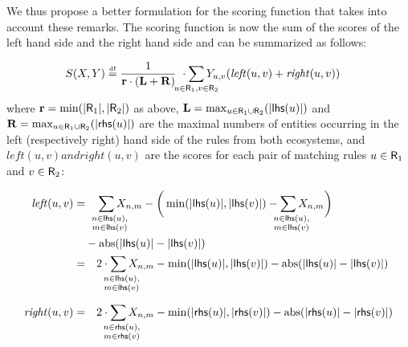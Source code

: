 \documentclass[a4paper,twoside]{article}
\begin{document}
We thus propose a better formulation for the scoring function that takes into account these remarks.
The  scoring function is now the sum of the scores of the left hand side and the right hand side and can be summarized as follows:

\begin{align*} 
  \gf(X, Y) \defeq {} 
  & \frac{1}{\rulemax \cdot (\Lhs + \Rhs) } ~\cdot \sum_{\mathclap{u \in \Ru_1, v \in \Ru_2}} Y_{u,v}  (\mathit{left}(u,v)+\mathit{right}(u,v) ) 
\end{align*}
%
where $\mathbf{r} = \min (|\mathsf{R}_1|, |\mathsf{R}_2|)$ as above, 
$\mathbf{L} =  \max_{u\in \mathsf{R}_1 \cup \mathsf{R}_2} (|\mathsf{lhs}(u)|)$ and \\
$\mathbf{R} = \max_{u\in \mathsf{R}_1 \cup \mathsf{R}_2} (|\mathsf{rhs}(u)|)$ 
%
 are the maximal numbers of entities occurring in the left (respectively right) hand side of the  rules from both ecosystems, and $ \mathit{left}(u,v) and  \mathit{right}(u,v) $ are the scores for each pair of matching rules $u \in \mathsf{R}_1$ and $v \in \mathsf{R}_2$:

\begin{align*} 
   \mathit{left}(u,v) =  &
    \quad  \sum_{\mathrlap{\substack{n \in \lhs{u},\\ m \in \lhs{v}}}} X_{n,m} 
          - \bigg(\min(|\lhs{u}|, |\lhs{v}|) - \sum_{\mathrlap{\substack{n \in \lhs{u},\\ m \in \lhs{v}}}} X_{n,m} \bigg) \\
         & - \abs(|\lhs{u}| - |\lhs{v}|)   \\ 
    = & \quad 2 \cdot \sum_{\mathrlap{\substack{n \in \lhs{u},\\ m \in \lhs{v}}}} X_{n,m} 
        - \min(|\lhs{u}|, |\lhs{v}|) 
        - \abs(|\lhs{u}| - |\lhs{v}|)   \\[2mm]
   \mathit{right}(u,v) = & \quad 2 \cdot \sum_{\mathrlap{\substack{n \in \rhs{u},\\ m \in \rhs{v}}}} X_{n,m}
                  - \min(|\rhs{u}|, |\rhs{v}|) 
                  - \abs(|\rhs{u}| - |\rhs{v}|)   
\end{align*}
\end{document}
